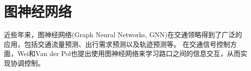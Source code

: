 
\section{图神经网络}
近些年来，图神经网络(Graph Neural Networks, GNN)在交通领略得到了广泛的应用，包括交通流量预测\cite{zhang2018kernel,guo2019attention}、出行需求预测\cite{shi2020predicting,hu2020stochastic}以及轨迹预测\cite{li2020social,sun2019socially,monti2021dag}等。
在交通信号控制方面，Wei\cite{wei2019colight}和Van der Pol\cite{van2016coordinated}也提出使用图神经网络来学习路口之间的信息交互，从而实现协调控制。
